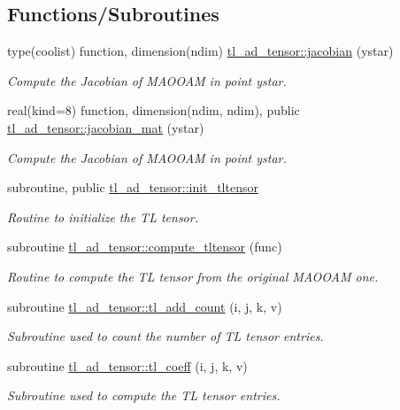 \subsection*{Functions/\+Subroutines}
\begin{DoxyCompactItemize}
\item 
type(coolist) function, dimension(ndim) \hyperlink{namespacetl__ad__tensor_af4dbec99377125d7df10d89524ba91b2}{tl\+\_\+ad\+\_\+tensor\+::jacobian} (ystar)
\begin{DoxyCompactList}\small\item\em Compute the Jacobian of M\+A\+O\+O\+AM in point ystar. \end{DoxyCompactList}\item 
real(kind=8) function, dimension(ndim, ndim), public \hyperlink{namespacetl__ad__tensor_a2782a5116e8bb677b2d5e9637b509cf3}{tl\+\_\+ad\+\_\+tensor\+::jacobian\+\_\+mat} (ystar)
\begin{DoxyCompactList}\small\item\em Compute the Jacobian of M\+A\+O\+O\+AM in point ystar. \end{DoxyCompactList}\item 
subroutine, public \hyperlink{namespacetl__ad__tensor_a8a94fe84e907fc8835f798eddcff38e8}{tl\+\_\+ad\+\_\+tensor\+::init\+\_\+tltensor}
\begin{DoxyCompactList}\small\item\em Routine to initialize the TL tensor. \end{DoxyCompactList}\item 
subroutine \hyperlink{namespacetl__ad__tensor_a8b1027b49025fbeacd8fbd5d2127bebc}{tl\+\_\+ad\+\_\+tensor\+::compute\+\_\+tltensor} (func)
\begin{DoxyCompactList}\small\item\em Routine to compute the TL tensor from the original M\+A\+O\+O\+AM one. \end{DoxyCompactList}\item 
subroutine \hyperlink{namespacetl__ad__tensor_a3d69845cace6faef04342c297b0c2a09}{tl\+\_\+ad\+\_\+tensor\+::tl\+\_\+add\+\_\+count} (i, j, k, v)
\begin{DoxyCompactList}\small\item\em Subroutine used to count the number of TL tensor entries. \end{DoxyCompactList}\item 
subroutine \hyperlink{namespacetl__ad__tensor_a0e37e78de771af0205bd80a30c911a68}{tl\+\_\+ad\+\_\+tensor\+::tl\+\_\+coeff} (i, j, k, v)
\begin{DoxyCompactList}\small\item\em Subroutine used to compute the TL tensor entries. \end{DoxyCompactList}\item 

\end{DoxyCompactItemize}
